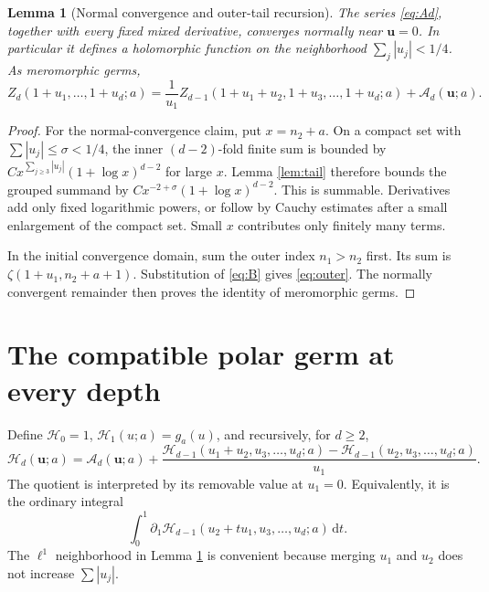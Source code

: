 \documentclass[11pt,a4paper]{article}
\numberwithin{equation}{section}
\newtheorem{lemma}[theorem]{Lemma}
\theoremstyle{definition}\newtheorem{definition}[theorem]{Definition}
\theoremstyle{remark}\newtheorem{remark}[theorem]{Remark}
\newcommand{\HH}{\mathcal H}
\newcommand{\Atail}{\mathcal A}
\newcommand{\dd}{\,\mathrm d}
\begin{document}
\begin{lemma}[Normal convergence and outer-tail recursion]\label{lem:normal}
The series \eqref{eq:Ad}, together with every fixed mixed derivative,
converges normally near $\bm u=0$. In particular it defines a holomorphic
function on the neighborhood
$\sum_j|u_j|<1/4$. As meromorphic germs,
\begin{equation}\label{eq:outer}
 Z_d(1+u_1,\ldots,1+u_d;a)
 =\frac1{u_1}Z_{d-1}(1+u_1+u_2,1+u_3,\ldots,1+u_d;a)
    +\Atail_d(\bm u;a).
\end{equation}
\end{lemma}
\begin{proof}
For the normal-convergence claim, put $x=n_2+a$. On a compact set with
$\sum|u_j|\le\sigma<1/4$, the inner $(d-2)$-fold finite sum is bounded by
$C x^{\sum_{j\ge3}|u_j|}(1+\log x)^{d-2}$ for large $x$. Lemma
\ref{lem:tail} therefore bounds the grouped summand by
$C x^{-2+\sigma}(1+\log x)^{d-2}$. This is summable. Derivatives add
only fixed logarithmic powers, or follow by Cauchy estimates after a
small enlargement of the compact set. Small $x$ contributes only finitely
many terms.

In the initial convergence domain, sum the outer index $n_1>n_2$ first.
Its sum is $\zeta(1+u_1,n_2+a+1)$. Substitution of \eqref{eq:B} gives
\eqref{eq:outer}. The normally convergent remainder then proves the
identity of meromorphic germs.
\end{proof}

\section{The compatible polar germ at every depth}
\label{sec:germ}

Define $\HH_0=1$, $\HH_1(u;a)=g_a(u)$, and recursively, for $d\ge2$,
\begin{equation}\label{eq:Hrec}
 \boxed{\displaystyle
 \HH_d(\bm u;a)=\Atail_d(\bm u;a)+
 \frac{\HH_{d-1}(u_1+u_2,u_3,\ldots,u_d;a)
       -\HH_{d-1}(u_2,u_3,\ldots,u_d;a)}{u_1}.}
\end{equation}
The quotient is interpreted by its removable value at $u_1=0$.
Equivalently, it is the ordinary integral
\begin{equation}\label{eq:DDint}
 \int_0^1\partial_1\HH_{d-1}(u_2+t u_1,u_3,\ldots,u_d;a)\dd t.
\end{equation}
The $\ell^1$ neighborhood in Lemma \ref{lem:normal} is convenient because
merging $u_1$ and $u_2$ does not increase $\sum|u_j|$.
\end{document}
